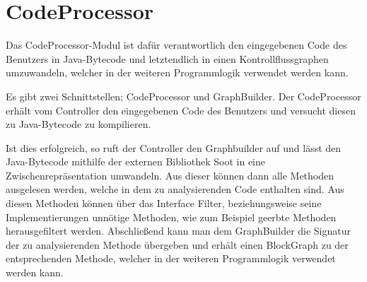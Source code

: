 
\section{CodeProcessor}

Das CodeProcessor-Modul ist dafür verantwortlich den eingegebenen Code des Benutzers in Java-Bytecode und letztendlich in einen Kontrollflussgraphen umzuwandeln, welcher in der weiteren Programmlogik verwendet werden kann.

Es gibt zwei Schnittstellen; CodeProcessor und GraphBuilder.
Der CodeProcessor erhält vom Controller den eingegebenen Code des Benutzers und versucht diesen zu Java-Bytecode zu kompilieren.

Ist dies erfolgreich, so ruft der Controller den Graphbuilder auf und lässt den Java-Bytecode mithilfe der externen Bibliothek Soot in eine Zwischenrepräsentation umwandeln.
Aus dieser können dann alle Methoden ausgelesen werden, welche in dem zu analysierenden Code enthalten sind.
Aus diesen Methoden können über das Interface Filter, beziehungsweise seine Implementierungen unnötige Methoden, wie zum Beispiel geerbte Methoden herausgefiltert werden.
Abschließend kann man dem GraphBuilder die Signatur der zu analysierenden Methode übergeben und erhält einen BlockGraph zu der entsprechenden Methode, welcher in der weiteren Programmlogik verwendet werden kann.